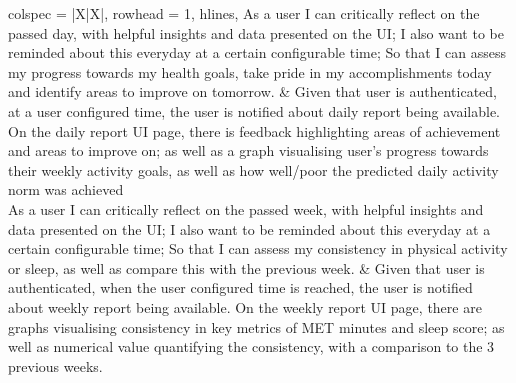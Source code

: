 \begin{center}
\begin{longtblr}[
            caption={User Stories},
            label={table:userStories}
        ] {
            colspec = {|X|X|},
            rowhead = 1,
            hlines,
        }
        As a user I can critically reflect on the passed day, with helpful insights and data presented on the UI; I also want to be reminded about this everyday at a certain configurable time; So that I can assess my progress towards my health goals, take pride in my accomplishments today and identify areas to improve on tomorrow.
        & 
        Given that user is authenticated, at a user configured time, the user is notified about daily report being available. On the daily report UI page, there is feedback highlighting areas of achievement and areas to improve on; as well as a graph visualising user's progress towards their weekly activity goals, as well as how well/poor the predicted daily activity norm was achieved
        \\

        As a user I can critically reflect on the passed week, with helpful insights and data presented on the UI; I also want to be reminded about this everyday at a certain configurable time; So that I can assess my consistency in physical activity or sleep, as well as compare this with the previous week.
        &
        Given that user is authenticated, when the user configured time is reached, the user is notified about weekly report being available. On the weekly report UI page, there are graphs visualising consistency in key metrics of MET minutes and sleep score; as well as numerical value quantifying the consistency, with a comparison to the 3 previous weeks. 
       \\


\end{longtblr}
\end{center}
